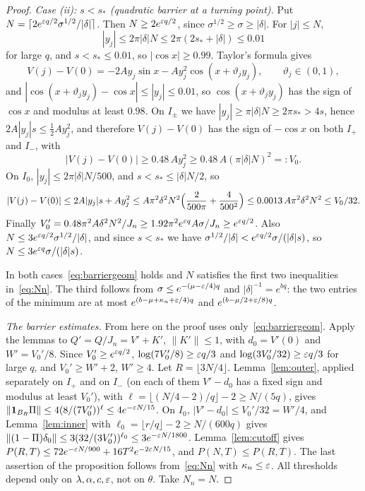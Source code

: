 \begin{proof}
\emph{Case (ii): $s<s_*$ (quadratic barrier at a turning point).} Put $N=\lceil2e^{\varepsilon q/2}\sigma^{1/2}/|\delta|\rceil$. Then $N\ge2e^{\varepsilon q/2}$, since $\sigma^{1/2}\ge\sigma\ge|\delta|$. For $|j|\le N$,
\[
|y_j|\le2\pi|\delta|N\le2\pi(2s_*+|\delta|)\le0.01
\]
for large $q$, and $s<s_*\le0.01$, so $|\cos x|\ge0.99$. Taylor's formula gives
\[
V(j)-V(0)=-2Ay_j\sin x-Ay_j^2\cos(x+\vartheta_jy_j),\qquad\vartheta_j\in(0,1),
\]
and $|\cos(x+\vartheta_jy_j)-\cos x|\le|y_j|\le0.01$, so $\cos(x+\vartheta_jy_j)$ has the sign of $\cos x$ and modulus at least $0.98$. On $I_\pm$ we have $|y_j|\ge\pi|\delta|N\ge2\pi s_*>4s$, hence $2A|y_j|s\le\frac12Ay_j^2$, and therefore $V(j)-V(0)$ has the sign of $-\cos x$ on both $I_+$ and $I_-$, with
\[
|V(j)-V(0)|\ge0.48\,Ay_j^2\ge0.48\,A(\pi|\delta|N)^2=:V_0.
\]
On $I_0$, $|y_j|\le2\pi|\delta|N/500$, and $s<s_*\le|\delta|N/2$, so
\[
|V(j)-V(0)|\le2A|y_j|s+Ay_j^2\le A\pi^2\delta^2N^2\Bigl(\frac{2}{500\pi}+\frac{4}{500^2}\Bigr)\le0.0013\,A\pi^2\delta^2N^2\le V_0/32.
\]
Finally $V_0'=0.48\pi^2A\delta^2N^2/J_n\ge1.92\pi^2e^{\varepsilon q}A\sigma/J_n\ge e^{\varepsilon q/2}$. Also $N\le3e^{\varepsilon q/2}\sigma^{1/2}/|\delta|$, and since $s<s_*$ we have $\sigma^{1/2}/|\delta|<e^{\varepsilon q/2}\sigma/(|\delta|s)$, so $N\le3e^{\varepsilon q}\sigma/(|\delta|s)$.

In both cases~\eqref{eq:barriergeom} holds and $N$ satisfies the first two inequalities in~\eqref{eq:Nn}. The third follows from $\sigma\le e^{-(\mu-\varepsilon/4)q}$ and $|\delta|^{-1}=e^{bq}$: the two entries of the minimum are at most $e^{(b-\mu+\kappa_n+\varepsilon/4)q}$ and $e^{(b-\mu/2+\varepsilon/8)q}$.

\emph{The barrier estimates.} From here on the proof uses only~\eqref{eq:barriergeom}. Apply the lemmas to $Q'=Q/J_n=V'+K'$, $\|K'\|\le1$, with $d_0=V'(0)$ and $W'=V_0'/8$. Since $V_0'\ge e^{\varepsilon q/2}$, $\log(7V_0'/8)\ge\varepsilon q/3$ and $\log(3V_0'/32)\ge\varepsilon q/3$ for large $q$, and $V_0'\ge W'+2$, $W'\ge4$. Let $R=\lfloor3N/4\rfloor$. Lemma~\ref{lem:outer}, applied separately on $I_+$ and on $I_-$ (on each of them $V'-d_0$ has a fixed sign and modulus at least $V_0'$), with $\ell=\lfloor(N/4-2)/q\rfloor-2\ge N/(5q)$, gives $\|\mathbf 1_{B_R}\Pi\|\le4(8/(7V_0'))^{\ell}\le4e^{-\varepsilon N/15}$. On $I_0$, $|V'-d_0|\le V_0'/32=W'/4$, and Lemma~\ref{lem:inner} with $\ell_0=\lfloor r/q\rfloor-2\ge N/(600q)$ gives $\|(1-\Pi)\delta_0\|\le3(32/(3V_0'))^{\ell_0}\le3e^{-\varepsilon N/1800}$. Lemma~\ref{lem:cutoff} gives $P(R,T)\le72e^{-\varepsilon N/900}+16T^2e^{-2\varepsilon N/15}$, and $P(N,T)\le P(R,T)$. The last assertion of the proposition follows from~\eqref{eq:Nn} with $\kappa_n\le\varepsilon$. All thresholds depend only on $\lambda,\alpha,c,\varepsilon$, not on $\theta$. Take $N_n=N$.
\end{proof}

